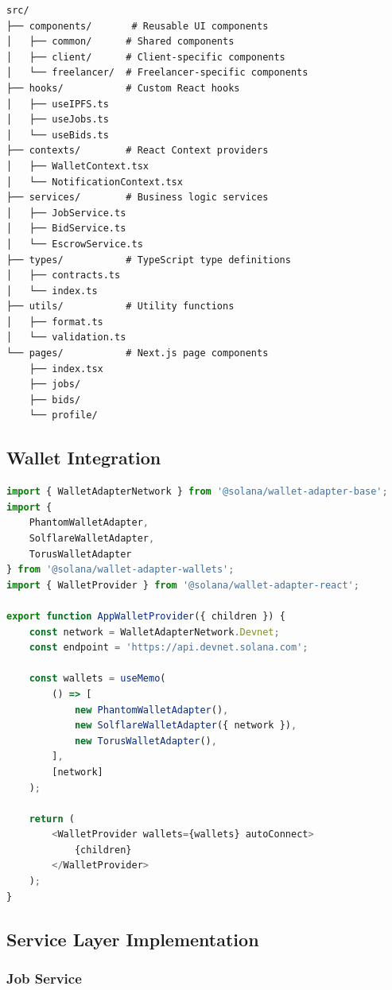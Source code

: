 \documentclass[a4paper,13pt,twoside]{report}
\theoremstyle{definition}
\begin{document}
\begin{lstlisting}[caption=Frontend Folder Structure]
src/
├── components/       # Reusable UI components
│   ├── common/      # Shared components
│   ├── client/      # Client-specific components
│   └── freelancer/  # Freelancer-specific components
├── hooks/           # Custom React hooks
│   ├── useIPFS.ts
│   ├── useJobs.ts
│   └── useBids.ts
├── contexts/        # React Context providers
│   ├── WalletContext.tsx
│   └── NotificationContext.tsx
├── services/        # Business logic services
│   ├── JobService.ts
│   ├── BidService.ts
│   └── EscrowService.ts
├── types/           # TypeScript type definitions
│   ├── contracts.ts
│   └── index.ts
├── utils/           # Utility functions
│   ├── format.ts
│   └── validation.ts
└── pages/           # Next.js page components
    ├── index.tsx
    ├── jobs/
    ├── bids/
    └── profile/
\end{lstlisting}

\subsection{Wallet Integration}

\begin{lstlisting}[language=TypeScript, caption=Wallet Context Provider]
import { WalletAdapterNetwork } from '@solana/wallet-adapter-base';
import {
    PhantomWalletAdapter,
    SolflareWalletAdapter,
    TorusWalletAdapter
} from '@solana/wallet-adapter-wallets';
import { WalletProvider } from '@solana/wallet-adapter-react';

export function AppWalletProvider({ children }) {
    const network = WalletAdapterNetwork.Devnet;
    const endpoint = 'https://api.devnet.solana.com';

    const wallets = useMemo(
        () => [
            new PhantomWalletAdapter(),
            new SolflareWalletAdapter({ network }),
            new TorusWalletAdapter(),
        ],
        [network]
    );

    return (
        <WalletProvider wallets={wallets} autoConnect>
            {children}
        </WalletProvider>
    );
}
\end{lstlisting}

\subsection{Service Layer Implementation}

\subsubsection{Job Service}
\end{document}
